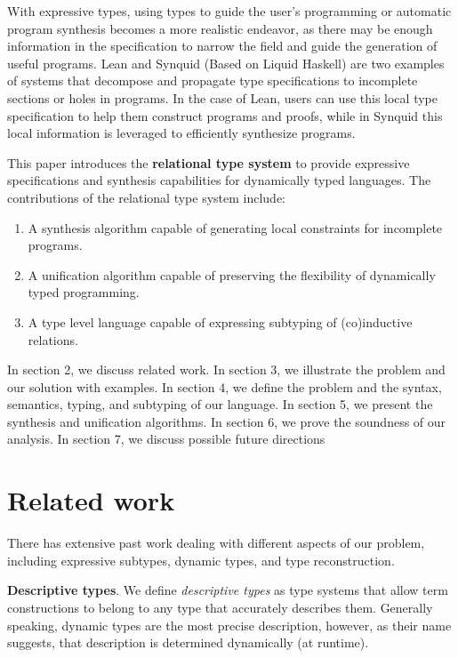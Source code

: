 \documentclass[sigplan]{acmart}
\theoremstyle{definition}
\begin{document}
With expressive types, using types to guide the user's programming or automatic program synthesis 
becomes a more realistic endeavor, as there may be enough information in the specification to narrow the field
and guide the generation of useful programs. Lean and Synquid\cite{} (Based on Liquid Haskell) 
are two examples of systems that decompose and propagate type specifications 
to incomplete sections or holes in programs. 
In the case of Lean, users can use this local type specification to help them construct programs and proofs,
while in Synquid this local information is leveraged to efficiently synthesize programs. 

This paper introduces the \textbf{relational type system} to provide expressive specifications 
and synthesis capabilities for dynamically typed languages. 
The contributions of the relational type system include:
\begin{enumerate}
  \item A synthesis algorithm capable of generating local constraints for incomplete programs. 
  \item A unification algorithm capable of preserving the flexibility of dynamically typed programming. 
  \item A type level language capable of expressing subtyping of (co)inductive relations. 
\end{enumerate}



In section 2, we discuss related work. 
In section 3, we illustrate the problem and our solution with examples.
In section 4, we define the problem and the syntax, semantics, typing, and subtyping of our language.
In section 5, we present the synthesis and unification algorithms.
In section 6, we prove the soundness of our analysis. 
In section 7, we discuss possible future directions

\section{Related work}
There has extensive past work dealing with different aspects of our problem,
including expressive subtypes, dynamic types, and type reconstruction.  
\newline 

\noindent
\textbf{Descriptive types}. We define \textit{descriptive types} as 
type systems that allow term constructions to belong to any type that accurately describes them. 
Generally speaking, dynamic types are the most precise description, however,
as their name suggests, that description is determined dynamically (at runtime).
\end{document}
